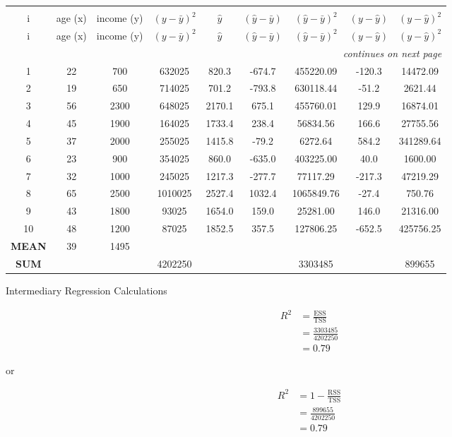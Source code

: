 \documentclass[12pt,a4paper]{article}
\renewcommand{\toprule}{\specialrule{.08em}{.05em}{.17em}\hline}
\renewcommand{\bottomrule}{\hline\specialrule{.08em}{.17em}{.05em}}
\begin{document}
\begin{longtable}{ccccccccc}
\toprule
  &&&&&&&& \\[-1.5ex]
i & age (x) & income (y) & $(y-\bar y)^2$ & $\hat y$ & $(\hat y-\bar y)$ & $(\hat y-\bar y)^2$ & $(y-\hat y)$ & $(y-\hat y)^2$ \\
\midrule
\endfirsthead
\toprule
i & age (x) & income (y) & $(y-\bar y)^2$ & $\hat y$ & $(\hat y-\bar y)$ & $(\hat y-\bar y)^2$ & $(y-\hat y)$ & $(y-\hat y)^2$ \\
\midrule
\endhead
\midrule \multicolumn{9}{r}{\itshape continues on next page}\\
\midrule
\endfoot
\bottomrule
\endlastfoot

1  & 22 & 700  & 632025  & 820.3  & -674.7 & 455220.09  & -120.3 & 14472.09 \\
2  & 19 & 650  & 714025  & 701.2  & -793.8 & 630118.44  & -51.2  & 2621.44 \\
3  & 56 & 2300 & 648025  & 2170.1 & 675.1  & 455760.01  & 129.9  & 16874.01 \\
4  & 45 & 1900 & 164025  & 1733.4 & 238.4  & 56834.56   & 166.6  & 27755.56 \\
5  & 37 & 2000 & 255025  & 1415.8 & -79.2  & 6272.64    & 584.2  & 341289.64 \\
6  & 23 & 900  & 354025  & 860.0  & -635.0 & 403225.00  & 40.0   & 1600.00 \\
7  & 32 & 1000 & 245025  & 1217.3 & -277.7 & 77117.29   & -217.3 & 47219.29 \\
8  & 65 & 2500 & 1010025 & 2527.4 & 1032.4 & 1065849.76 & -27.4  & 750.76 \\
9  & 43 & 1800 & 93025   & 1654.0 & 159.0  & 25281.00   & 146.0  & 21316.00 \\
10 & 48 & 1200 & 87025   & 1852.5 & 357.5  & 127806.25  & -652.5 & 425756.25 \\
\midrule
\textbf{MEAN} & 39 & 1495 &  &  &  &  &  & \\
\textbf{SUM}  &    &      & 4202250 &  &  & 3303485 &  & 899655 \\
\end{longtable}
\captionsetup{type=table}
\caption{Intermediary Regression Calculations}
\label{tbl:regcalc}
\endgroup
\FloatBarrier

\newpage

\begin{align*}
R^2 &= \frac{\text{ESS}}{\text{TSS}} \\[1ex]
                &= \frac{3303485}{4202250} \\[1ex]
                &= 0.79
\end{align*}

or

\begin{align*}
R^2 &= 1 - \frac{\text{RSS}}{\text{TSS}} \\[1ex]
                &= \frac{899655}{4202250} \\[1ex]
                &= 0.79
\end{align*}


\printbibliography[title=List of References]
\end{document}
